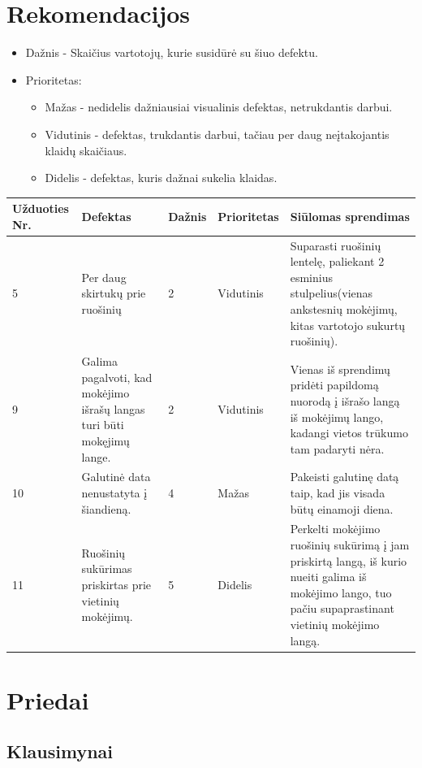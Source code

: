 \documentclass[oneside]{VUMIFPSkursinis}
\begin{document}
\section{Rekomendacijos}

\begin{itemize}
	\item Dažnis - Skaičius vartotojų, kurie susidūrė su šiuo defektu.
	\item Prioritetas:
		\begin{itemize}
			\item Mažas - nedidelis dažniausiai visualinis defektas, netrukdantis darbui.
			\item Vidutinis - defektas, trukdantis darbui, tačiau per daug neįtakojantis klaidų skaičiaus.
			\item Didelis - defektas, kuris dažnai sukelia klaidas.
		\end{itemize}
\end{itemize}
\begin{center}
    \begin{tabular}{ |p{2cm}| p{4cm} | p{2cm} | p{2cm} | p{5cm} |}
    \hline
	Užduoties Nr.&Defektas&Dažnis&Prioritetas&Siūlomas sprendimas\\ \hline
	5&Per daug skirtukų prie ruošinių &2&Vidutinis&Suparasti ruošinių lentelę, paliekant 2 esminius stulpelius(vienas ankstesnių mokėjimų, kitas vartotojo sukurtų ruošinių). \\ \hline
	9&Galima pagalvoti, kad mokėjimo išrašų langas turi būti mokęjimų lange.&2&Vidutinis&Vienas iš sprendimų pridėti papildomą nuorodą į išrašo langą iš mokėjimų lango, kadangi vietos trūkumo tam padaryti nėra.\\ \hline
	10&Galutinė data nenustatyta į šiandieną.&4&Mažas&Pakeisti galutinę datą taip, kad jis visada būtų einamoji diena. \\ \hline
	11&Ruošinių sukūrimas priskirtas prie vietinių mokėjimų.&5&Didelis& Perkelti mokėjimo ruošinių sukūrimą į jam priskirtą langą, iš kurio nueiti galima iš mokėjimo lango, tuo pačiu supaprastinant vietinių mokėjimo langą. \\ \hline
    \end{tabular}
\end{center}

\section{Priedai}
\subsection{Klausimynai}
\end{document}
